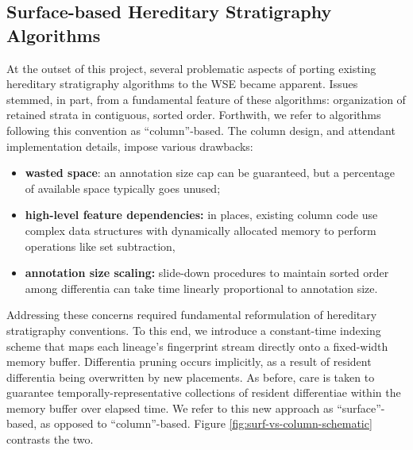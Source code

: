 \subsection{Surface-based Hereditary Stratigraphy Algorithms}

At the outset of this project, several problematic aspects of porting existing hereditary stratigraphy algorithms to the WSE became apparent.
Issues stemmed, in part, from a fundamental feature of these algorithms: organization of retained strata in contiguous, sorted order.
Forthwith, we refer to algorithms following this convention as ``column''-based.
The column design, and attendant implementation details, impose various drawbacks:
\begin{itemize}
\item \textbf{wasted space}: an annotation size cap can be guaranteed, but a percentage of available space typically goes unused;
\item \textbf{high-level feature dependencies:} in places, existing column code use complex data structures with dynamically allocated memory to perform operations like set subtraction,
\item \textbf{annotation size scaling:} slide-down procedures to maintain sorted order among differentia can take time linearly proportional to annotation size.
\end{itemize}



Addressing these concerns required fundamental reformulation of hereditary stratigraphy conventions.
To this end, we introduce a constant-time indexing scheme that maps each lineage's fingerprint stream directly onto a fixed-width memory buffer.
Differentia pruning occurs implicitly, as a result of resident differentia being overwritten by new placements.
As before, care is taken to guarantee temporally-representative collections of resident differentiae within the memory buffer over elapsed time.
We refer to this new approach as ``surface''-based, as opposed to ``column''-based.
Figure \ref{fig:surf-vs-column-schematic} contrasts the two.




